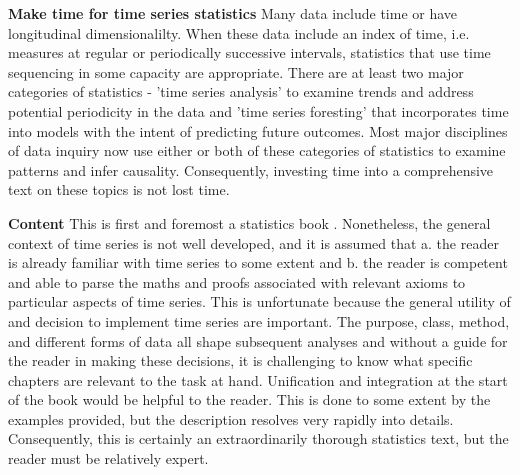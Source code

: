 \documentclass[bookreview]{jss}
\begin{document}
\textbf{Make time for time series statistics} \newline
Many data include time or have longitudinal dimensionalilty. When these data include an index of time, i.e. measures at regular or periodically successive intervals, statistics that use time sequencing in some capacity are appropriate. There are at least two major categories of statistics - 'time series analysis' to examine trends and address potential periodicity in the data and 'time series foresting' that incorporates time into models with the intent of predicting future outcomes. Most major disciplines of data inquiry now use either or both of these categories of statistics to examine patterns and infer causality. Consequently, investing time into a comprehensive text on these topics is not lost time.  \newline


\textbf{Content} \newline
This is first and foremost a statistics book \citep{Woodward2017}. Nonetheless, the general context of time series is not well developed, and it is assumed that a. the reader is already familiar with time series to some extent and b. the reader is competent and able to parse the maths and proofs associated with relevant axioms to particular aspects of time series. This is unfortunate because the general utility of and decision to implement time series are important. The purpose, class, method, and different forms of data all shape subsequent analyses and without a guide for the reader in making these decisions, it is challenging to know what specific chapters are relevant to the task at hand. Unification and integration at the start of the book would be helpful to the reader. This is done to some extent by the examples provided, but the description resolves very rapidly into details. Consequently, this is certainly an extraordinarily thorough statistics text, but the reader must be relatively expert. \newline
\end{document}
